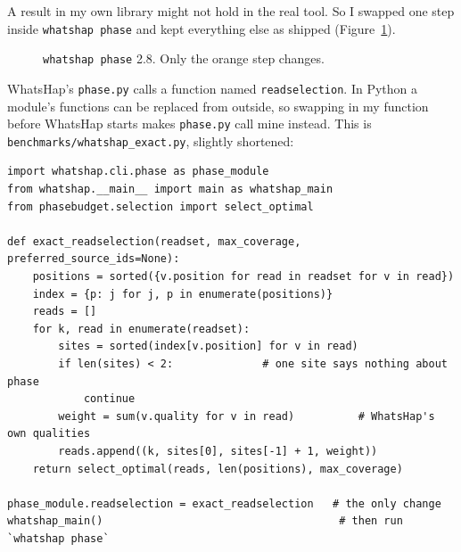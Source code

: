 \documentclass[11pt]{article}
\newcommand{\code}[1]{\texttt{#1}}
\begin{document}
A result in my own library might not hold in the real tool. So I swapped
one step inside \code{whatshap phase} and kept everything else as shipped
(Figure~\ref{fig:patch}).

\begin{figure}[h]
\centering
{}
\caption{\code{whatshap phase} 2.8. Only the orange step changes.}
\label{fig:patch}
\end{figure}

WhatsHap's \code{phase.py} calls a function named \code{readselection}. In
Python a module's functions can be replaced from outside, so swapping in my
function before WhatsHap starts makes \code{phase.py} call mine instead. This
is \code{benchmarks/whatshap\_exact.py}, slightly shortened:

\begin{lstlisting}
import whatshap.cli.phase as phase_module
from whatshap.__main__ import main as whatshap_main
from phasebudget.selection import select_optimal

def exact_readselection(readset, max_coverage, preferred_source_ids=None):
    positions = sorted({v.position for read in readset for v in read})
    index = {p: j for j, p in enumerate(positions)}
    reads = []
    for k, read in enumerate(readset):
        sites = sorted(index[v.position] for v in read)
        if len(sites) < 2:              # one site says nothing about phase
            continue
        weight = sum(v.quality for v in read)          # WhatsHap's own qualities
        reads.append((k, sites[0], sites[-1] + 1, weight))
    return select_optimal(reads, len(positions), max_coverage)

phase_module.readselection = exact_readselection   # the only change
whatshap_main()                                     # then run `whatshap phase`
\end{lstlisting}
\end{document}
